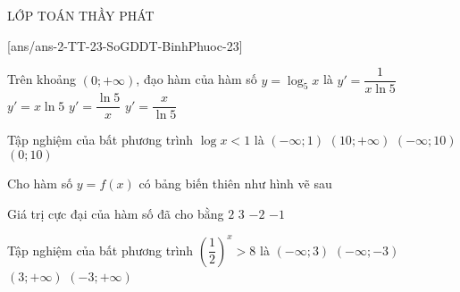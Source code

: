 \begin{name}
	{\tenchude}{\tendethi}{LỚP TOÁN THẦY PHÁT}{\thoigian}
\end{name}
 
\setcounter{ex}{0}\setcounter{bt}{0}
[ans/ans-2-TT-23-SoGDDT-BinhPhuoc-23]
\begin{ex}%
	Trên khoảng $(0;+\infty)$, đạo hàm của hàm số $y=\log_5x$ là
	\choice
	{\True $y'=\dfrac{1}{x\ln 5}$}
	{$y'=x\ln 5$}
	{$y'=\dfrac{\ln 5}{x}$}
	{$y'=\dfrac{x}{\ln 5}$}
\end{ex}

\begin{ex}%
	Tập nghiệm của bất phương trình $\log x<1$ là
	\choice
	{$(-\infty;1)$}
	{$(10;+\infty)$}
	{$(-\infty;10)$}
	{\True $(0;10)$}
\end{ex}

\begin{ex}%
	Cho hàm số $y=f(x)$ có bảng biến thiên như hình vẽ sau
	\begin{center}
	\end{center}
	Giá trị cực đại của hàm số đã cho bằng
	\choice
	{$2$}
	{\True $3$}
	{$-2$}
	{$-1$}
\end{ex}

\begin{ex}%
	Tập nghiệm của bất phương trình $\left(\dfrac{1}{2}\right)^x>8$ là
	\choice
	{$(-\infty ;3)$}
	{\True $(-\infty ;-3)$}
	{$(3;+\infty)$}
	{$(-3;+\infty)$}
\end{ex}

